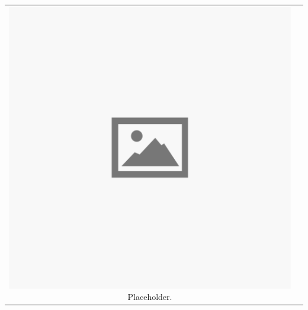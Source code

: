 \begin{tabular}{c p{}}
	\begin{minipage}{0.25\textwidth}
		\vspace*{48px}
		\includegraphics[width=\linewidth]{Images/Placeholder}
		\centering \label{fig:test_c}Placeholder.
	\end{minipage} &
	
	\begin{minipage}[t]{0.75\textwidth}
		\vspace*{-64px}
		\blindtext
	\end{minipage}
\end{tabular}
